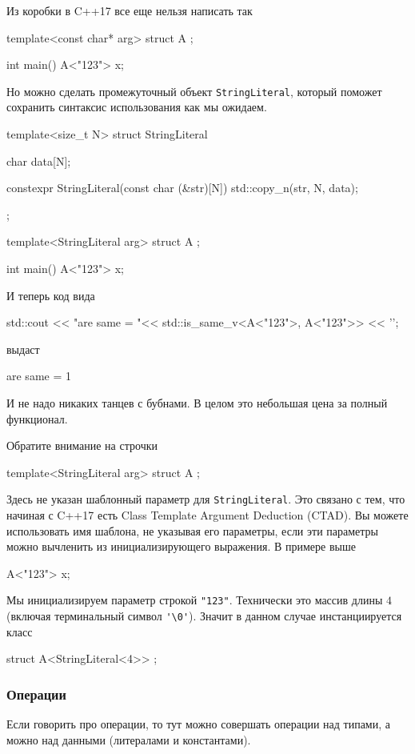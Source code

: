 Из коробки в C++17 все еще нельзя написать так
\begin{cppcode}
template<const char* arg>
struct A {};

int main() {
  A<"123"> x;
}
\end{cppcode}
Но можно сделать промежуточный объект \verb"StringLiteral", который поможет сохранить синтаксис использования как мы ожидаем.
\begin{cppcode}
template<size_t N>
struct StringLiteral {
  char data[N]{};
  
  constexpr StringLiteral(const char (&str)[N]) {
    std::copy_n(str, N, data);
  }
};

template<StringLiteral arg>
struct A {};

int main() {
  A<"123"> x;
}
\end{cppcode}
И теперь код вида
\begin{cppcode}
std::cout << "are same = "<< std::is_same_v<A<"123">, A<"123">> << '\n';
\end{cppcode}выдаст
\begin{cppcode}
are same = 1
\end{cppcode}
И не надо никаких танцев с бубнами.
В целом это небольшая цена за полный функционал.

Обратите внимание на строчки
\begin{cppcode}
template<StringLiteral arg>
struct A {};
\end{cppcode}
Здесь не указан шаблонный параметр для \verb"StringLiteral".
Это связано с тем, что начиная с C++17 есть Class Template Argument Deduction (CTAD).
Вы можете использовать имя шаблона, не указывая его параметры, если эти параметры можно вычленить из инициализирующего выражения.
В примере выше
\begin{cppcode}
A<"123"> x;
\end{cppcode}
Мы инициализируем параметр строкой \verb$"123"$.
Технически это массив длины $4$ (включая терминальный символ \verb"'\0'").
Значит в данном случае инстанциируется класс
\begin{cppcode}
struct A<StringLiteral<4>> {};
\end{cppcode}

\subsubsection{Операции}

Если говорить про операции, то тут можно совершать операции над типами, а можно над данными (литералами и константами).

